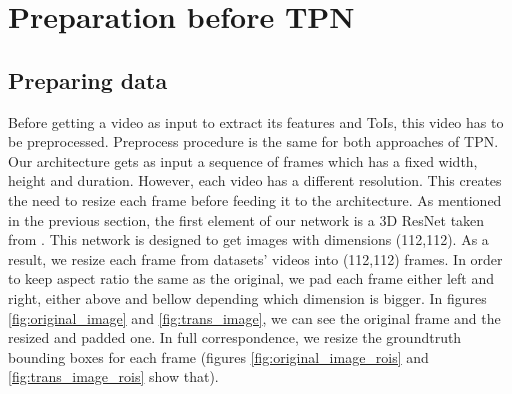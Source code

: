 \section{Preparation before TPN}

\subsection{Preparing data}
Before getting a video as input to extract its features and ToIs, this video has to be preprocessed.
Preprocess procedure  is the same for both approaches of TPN.
Our architecture gets as input a sequence of frames which has a fixed  width, height and duration. However, each video has a different resolution. This creates the
need to resize each frame before feeding it to the architecture.
As mentioned in the previous section, the first element of our network is a 3D ResNet taken from \cite{hara3dcnns}. This network is designed to
get images with dimensions (112,112). As a result, we resize each frame from datasets' videos into (112,112) frames. In order to keep aspect ratio the same as the original, we pad each frame either
left and right, either above and bellow depending which dimension is bigger. In figures \ref{fig:original_image} and \ref{fig:trans_image}, we can see the original frame and the resized and padded one.
In full correspondence, we resize the groundtruth bounding boxes for each frame (figures \ref{fig:original_image_rois} and \ref{fig:trans_image_rois} show that).

